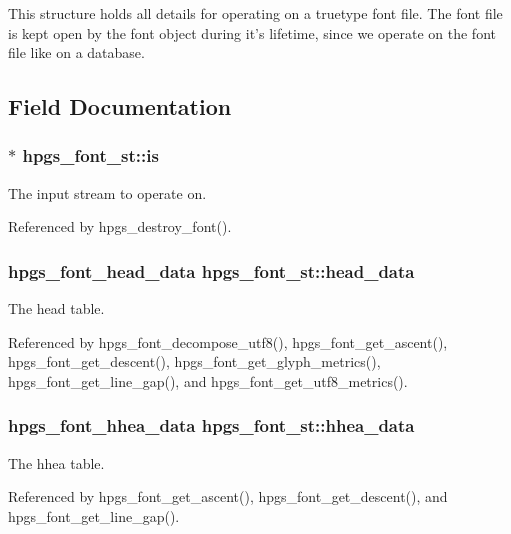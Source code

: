 This structure holds all details for operating on a truetype font file. The font file is kept open by the font object during it's lifetime, since we operate on the font file like on a database. 

\subsection{Field Documentation}
\subsubsection[is]{$\ast$ {\bf hpgs\_\-font\_\-st::is}}\label{structhpgs__font__st_778495b16d83becad5feea7c240e4b1a}


The input stream to operate on. 

Referenced by hpgs\_\-destroy\_\-font().
\subsubsection[head\_\-data]{\setlength{\rightskip}{0pt plus 5cm}hpgs\_\-font\_\-head\_\-data {\bf hpgs\_\-font\_\-st::head\_\-data}}\label{structhpgs__font__st_e44f21e47f3899aa4b93e29ac37b9c18}


The head table. 

Referenced by hpgs\_\-font\_\-decompose\_\-utf8(), hpgs\_\-font\_\-get\_\-ascent(), hpgs\_\-font\_\-get\_\-descent(), hpgs\_\-font\_\-get\_\-glyph\_\-metrics(), hpgs\_\-font\_\-get\_\-line\_\-gap(), and hpgs\_\-font\_\-get\_\-utf8\_\-metrics().
\subsubsection[hhea\_\-data]{\setlength{\rightskip}{0pt plus 5cm}hpgs\_\-font\_\-hhea\_\-data {\bf hpgs\_\-font\_\-st::hhea\_\-data}}\label{structhpgs__font__st_d99549398296db0897256d54cbbc13f3}


The hhea table. 

Referenced by hpgs\_\-font\_\-get\_\-ascent(), hpgs\_\-font\_\-get\_\-descent(), and hpgs\_\-font\_\-get\_\-line\_\-gap().
